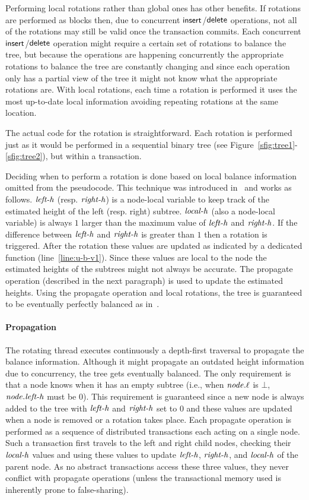 Performing local rotations rather than global ones has other benefits.
If rotations are performed as blocks then, due to concurrent  $\act{insert}$/$\act{delete}$ operations, not all of the rotations may still be valid once the transaction commits.
Each concurrent $\act{insert}$/$\act{delete}$ operation might require a certain set of rotations to balance the tree,
but because the operations are happening concurrently the appropriate rotations to balance the tree are constantly changing
and since each operation only has a partial view of the tree it might not know what the appropriate rotations are.
With local rotations, each time a rotation is performed it uses the most up-to-date local information avoiding repeating rotations at the same location.

The actual code for the rotation is straightforward.
Each rotation is performed just as it would be performed in a sequential binary tree (see Figure~\ref{sfig:tree1}-\ref{sfig:tree2}), but within a transaction.

Deciding when to perform a rotation is done based on local balance information omitted from the pseudocode.
This technique was introduced in~\cite{IRISAppr} and works as follows.
$\ms{left-h}$ (resp. $\ms{right-h}$) is a node-local variable to keep track of the estimated height of the left (resp. right) subtree.
$\ms{local-h}$ (also a node-local variable) is always $1$ larger than the maximum value of $\ms{left-h}$ and $\ms{right-h}$.
If the difference between $\ms{left-h}$ and $\ms{right-h}$ is greater than $1$ then a rotation is triggered.
After the rotation these values are updated as indicated by a dedicated function (line~\ref{line:u-b-v1}).
Since these values are local to the node the estimated heights of the subtrees might not always be accurate.
The propagate operation (described in the next paragraph) is used to update the estimated heights.
Using the propagate operation and local rotations, the tree is guaranteed to be eventually perfectly balanced
as in~\cite{IRISAppr,BCCO10}.

\paragraph{Propagation}
The rotating thread executes continuously a depth-first traversal to propagate the balance information.
Although it might propagate an outdated height information due to concurrency, the tree gets eventually balanced.
The only requirement is that a node knows when it has an empty subtree (i.e., when $\ms{node.\ell}$ is $\bot$, $\ms{node.left-h}$ must be $0$).
This requirement is guaranteed since a new node is always added to the tree with $\ms{left-h}$ and $\ms{right-h}$ set to $0$
and these values are updated when 
a node is removed or a rotation takes place.
Each propagate operation is performed as a sequence of distributed transactions each acting on a single node.
Such a transaction
first travels to the left and right child nodes, checking their $\ms{local-h}$ values and using these values to update
$\ms{left-h}$, $\ms{right-h}$, and $\ms{local-h}$ of the parent node.
As no abstract transactions access these three values, they never conflict with propagate operations (unless the transactional 
memory used is inherently prone to false-sharing).

